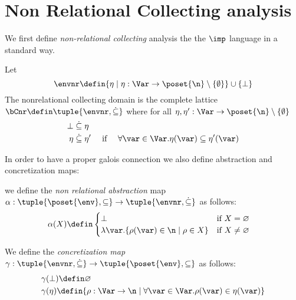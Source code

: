 \section{Non Relational Collecting analysis}
\label{sec:nonrel}

We first define \emph{non-relational collecting} analysis the the
\(\imp\) language in a standard way.

\begin{definition}
  Let
  \begin{equation*}
    \envnr \defin \{\eta \mid \eta: \Var \to \poset{\n}\setminus
    \{\emptyset\}\} \cup \{\bot\}
  \end{equation*}
  The nonrelational collecting domain is the complete lattice
  \(\bCnr \defin \tuple{\envnr,\dot{\subseteq}}\) where for all
  \(\eta,\eta':\Var \to \poset{\n} \setminus \{\emptyset\}\)
  \begin{align*}
    \bot & \mathrel{\dot{\subseteq}} \eta\\
    \eta & \mathrel{\dot{\subseteq}} \eta' & \text{ if }\quad \forall
                                             \var\in \Var. \eta(\var)\subseteq \eta'(\var)
  \end{align*}
\end{definition}

In order to have a proper galois connection we also define abstraction
and concretization maps:

\begin{definition}
  we define the \emph{non relational abstraction} map
  \(\alpha: \tuple{\poset{\env},\subseteq} \to
  \tuple{\envnr,\dot{\subseteq}}\) as follows:
  \begin{align*}
    &\alpha(X) \defin 
      \begin{cases}
        \bot & \text{if }X=\varnothing\\
        \lambda \var. \{\rho(\var) \in \n \mid \rho \in X\} &\text{if }X\neq \varnothing\\
      \end{cases}
  \end{align*}
\end{definition}

\begin{definition}
  We define the \emph{concretization map}
  \(\gamma: \tuple{\envnr,\dot{\subseteq}} \to
  \tuple{\poset{\env},\subseteq}\) as follows:
  \begin{align*}
    &\gamma(\bot) \defin \varnothing\\
    &\gamma(\eta) \defin \{\rho : \Var \to \n \mid \forall \var \in \Var. \rho(\var)\in \eta(\var)\}
  \end{align*}
\end{definition}

